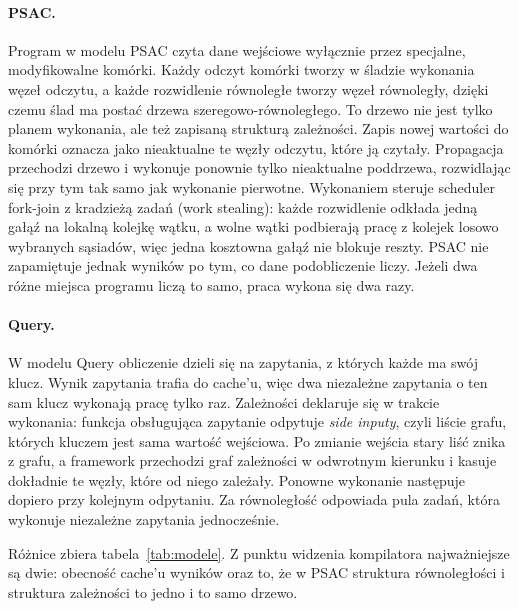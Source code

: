 \documentclass[11pt,a4paper]{article}
\begin{document}
\paragraph{PSAC.} Program w modelu PSAC czyta dane wejściowe wyłącznie przez
specjalne, modyfikowalne komórki. Każdy odczyt komórki tworzy w śladzie wykonania
węzeł odczytu, a każde rozwidlenie równoległe tworzy węzeł równoległy, dzięki
czemu ślad ma postać drzewa szeregowo-równoległego. To drzewo nie jest tylko
planem wykonania, ale też zapisaną strukturą zależności. Zapis nowej wartości do
komórki oznacza jako nieaktualne te węzły odczytu, które ją czytały. Propagacja
przechodzi drzewo i wykonuje ponownie tylko nieaktualne poddrzewa, rozwidlając
się przy tym tak samo jak wykonanie pierwotne. Wykonaniem steruje scheduler
fork-join z kradzieżą zadań (work stealing): każde rozwidlenie odkłada jedną
gałąź na lokalną kolejkę wątku, a wolne wątki podbierają pracę z kolejek losowo
wybranych sąsiadów, więc jedna kosztowna gałąź nie blokuje reszty. PSAC nie
zapamiętuje jednak wyników po tym, co dane podobliczenie liczy. Jeżeli dwa różne
miejsca programu liczą to samo, praca wykona się dwa razy.

\paragraph{Query.} W modelu Query obliczenie dzieli się na zapytania, z których
każde ma swój klucz. Wynik zapytania trafia do cache'u, więc dwa niezależne
zapytania o ten sam klucz wykonają pracę tylko raz. Zależności deklaruje się
w trakcie wykonania: funkcja obsługująca zapytanie odpytuje \emph{side inputy},
czyli liście grafu, których kluczem jest sama wartość wejściowa. Po zmianie
wejścia stary liść znika z grafu, a framework przechodzi graf zależności
w odwrotnym kierunku i kasuje dokładnie te węzły, które od niego zależały.
Ponowne wykonanie następuje dopiero przy kolejnym odpytaniu. Za równoległość
odpowiada pula zadań, która wykonuje niezależne zapytania jednocześnie.

Różnice zbiera tabela~\ref{tab:modele}. Z punktu widzenia kompilatora
najważniejsze są dwie: obecność cache'u wyników oraz to, że w PSAC struktura
równoległości i struktura zależności to jedno i to samo drzewo.
\end{document}
